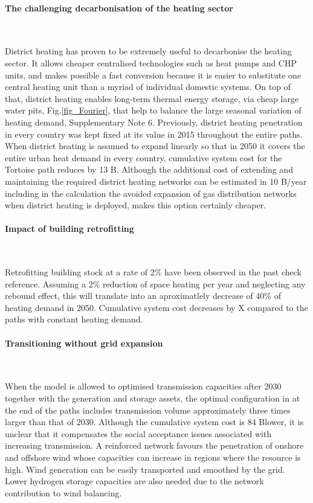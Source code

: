 \documentclass[5p]{elsarticle} %
\begin{document}
\paragraph{\textbf{The challenging decarbonisation of the heating sector}} \

District heating has proven to be extremely useful to decarbonise the heating sector. It allows cheaper centralised technologies such as heat pumps and CHP units, and makes possible a fast conversion because it is easier to substitute one central heating unit than a myriad of individual domestic systems. On top of that, district heating enables long-term thermal energy storage, via cheap large water pits, Fig.\ref{fig_Fourier}, that help to balance the large seasonal variation of heating demand, Supplementary Note 6. Previously, district heating penetration in every country was kept fixed at its value in 2015 \cite{DH_penetration} throughout the entire paths. When district heating is assumed to expand linearly so that in 2050 it covers the entire urban heat demand in every country, cumulative system cost for the Tortoise path reduces by 13 B\EUR. Although the additional cost of extending and maintaining the required district heating networks can be estimated in 10 B\EUR/year \cite{Brown_2018} including in the calculation the avoided expansion of gas distribution networks when district heating is deployed, makes this option certainly cheaper. 

\paragraph{\textbf{Impact of building retrofitting}} \

Retrofitting building stock at a rate of 2\% have been observed in the past \cite{agora}\textcolor[rgb]{1,0,0}{check reference}. Assuming a 2\% reduction of space heating per year and neglecting any rebound effect, this will translate into an aproximatlely decrease of 40\% of heating demand in 2050. Cumulative system cost decreases by \textcolor[rgb]{1,0,0}{X} \EUR compared to the paths with constant heating demand.


\paragraph{\textbf{Transitioning without grid expansion}} \

When the model is allowed to optimised transmission capacities after 2030 together with the generation and storage assets, the optimal configuration in at the end of the paths includes transmission volume approximately three times larger than that of 2030.  Although the cumulative system cost is 84 B\EUR lower, it is unclear that it compensates the social acceptance issues associated with increasing transmission. A reinforced network favours the penetration of onshore and offshore wind whose capacities can increase in regions where the resource is high. Wind generation can be easily transported and smoothed by the grid. Lower hydrogen storage capacities are also needed due to the network contribution to wind balancing. 
\end{document}
